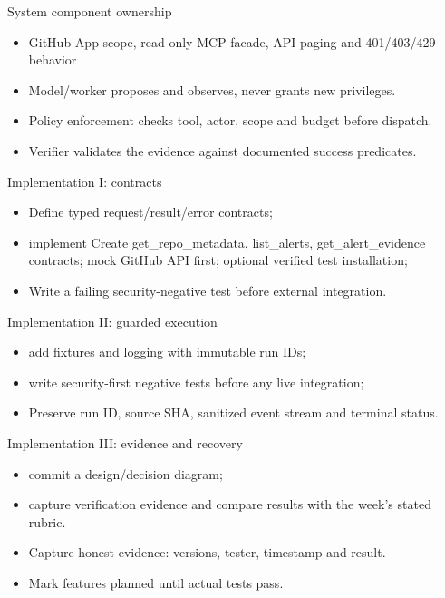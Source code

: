 \documentclass[aspectratio=169,10pt]{beamer}
\begin{document}
\begin{frame}{System component ownership}
\small
\begin{itemize}
\item GitHub App scope, read-only MCP facade, API paging and 401/403/429 behavior
\item Model/worker proposes and observes, never grants new privileges.
\item Policy enforcement checks tool, actor, scope and budget before dispatch.
\item Verifier validates the evidence against documented success predicates.
\end{itemize}

\end{frame}

\begin{frame}{Implementation I: contracts}
\small
\begin{itemize}
\item Define typed request/result/error contracts;
\item implement Create get\_repo\_metadata, list\_alerts, get\_alert\_evidence contracts; mock GitHub API first; optional verified test installation;
\item Write a failing security-negative test before external integration.
\end{itemize}

\end{frame}

\begin{frame}{Implementation II: guarded execution}
\small
\begin{itemize}
\item add fixtures and logging with immutable run IDs;
\item write security-first negative tests before any live integration;
\item Preserve run ID, source SHA, sanitized event stream and terminal status.
\end{itemize}

\end{frame}

\begin{frame}{Implementation III: evidence and recovery}
\small
\begin{itemize}
\item commit a design/decision diagram;
\item capture verification evidence and compare results with the week's stated rubric.
\item Capture honest evidence: versions, tester, timestamp and result.
\item Mark features planned until actual tests pass.
\end{itemize}

\end{frame}
\end{document}
